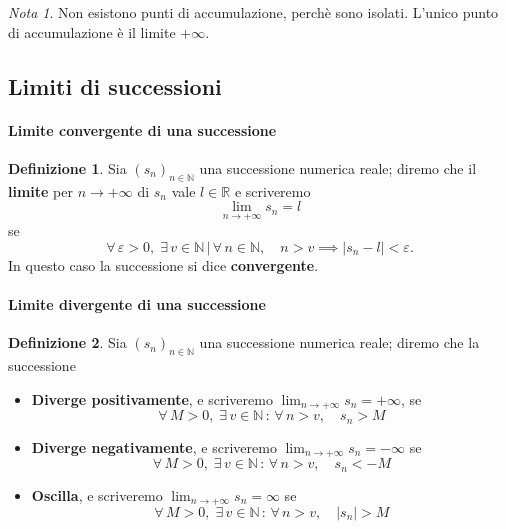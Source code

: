 \documentclass{article}
\theoremstyle{plain}
\theoremstyle{definition}
\newtheorem{defn}{Definizione}[section]
\theoremstyle{remark}
\newtheorem{note}{Nota}
\begin{document}
\vspace{10pt}

\begin{note}
    Non esistono punti di accumulazione, perchè sono isolati. L'unico punto di accumulazione è il limite $+\infty$.
\end{note}

\vspace{10pt}

\subsection{Limiti di successioni}

\vspace{10pt}

\paragraph{Limite convergente di una successione}
\begin{bxthm}
\begin{defn}
    Sia $(s_n)_{n\in\mathbb{N}}$ una successione numerica reale; diremo che il \textbf{limite} per $n\to+\infty$ di $s_n$ vale $l\in\mathbb{R}$ e scriveremo 
    \[\lim_{n\to+\infty}s_n=l\]
    se 
    \[\forall\,\varepsilon>0,\;\exists\,v\in\mathbb{N}\,|\,\forall\,n\in\mathbb{N},\quad n>v\implies |s_n-l|<\varepsilon.\]
    In questo caso la successione si dice \textbf{convergente}.
\end{defn}
\end{bxthm}

\vspace{10pt}

\paragraph{Limite divergente di una successione}
\begin{bxthm}
\begin{defn}
    Sia $(s_n)_{n\in\mathbb{N}}$ una successione numerica reale; diremo che la successione
    \begin{itemize}
        \item \textbf{Diverge positivamente}, e scriveremo $\lim_{n\to+\infty}s_n=+\infty$, se \[\forall\,M>0,\;\exists\,v\in\mathbb{N}\,:\,\forall\,n>v,\quad s_n>M\]
        \item \textbf{Diverge negativamente}, e scriveremo $\lim_{n\to+\infty}s_n=-\infty$ se \[\forall\,M>0,\;\exists\,v\in\mathbb{N}\,:\,\forall\,n>v,\quad s_n<-M\]
        \item \textbf{Oscilla}, e scriveremo $\lim_{n\to+\infty}s_n=\infty$ se \[\forall\,M>0,\;\exists\,v\in\mathbb{N}\,:\,\forall\,n>v,\quad |s_n|>M\]
    \end{itemize}
\end{defn}
\end{bxthm}
\end{document}

